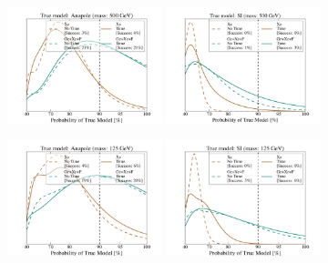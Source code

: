 \documentclass[11pt]{article}
\begin{document}
\begin{figure}
\centering
\includegraphics[width=0.4\textwidth, trim=.6cm 0.0cm .6cm 0.0cm,clip=true]{plots/PDF_Single_500GeV_Anapole_50sims_Xe_vs_FGeXe_GF_TNT.pdf}
\includegraphics[width=0.4\textwidth, trim=.6cm 0.0cm .6cm 0.0cm,clip=true]{plots/PDF_Single_500GeV_SI_Higgs_50sims_Xe_vs_FGeXe_GF_TNT.pdf}

\includegraphics[width=0.4\textwidth, trim=.6cm 0.0cm .6cm 0.0cm,clip=true]{plots/PDF_Single_125GeV_Anapole_50sims_Xe_vs_FGeXe_GF_TNT.pdf}
\includegraphics[width=0.4\textwidth, trim=.6cm 0.0cm .6cm 0.0cm,clip=true]{plots/PDF_Single_125GeV_SI_Higgs_50sims_Xe_vs_FGeXe_GF_TNT.pdf}


\end{figure}
\end{document}
